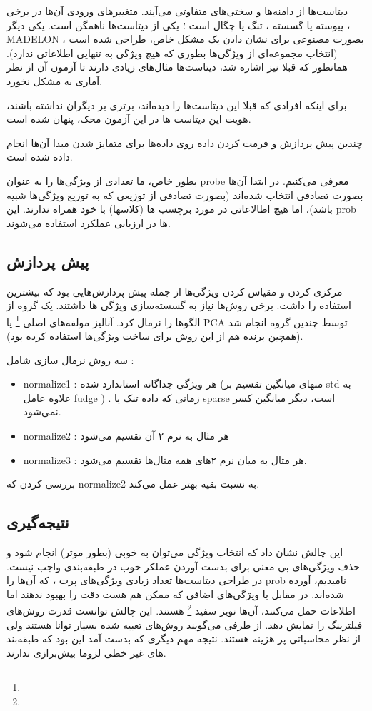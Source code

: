 \documentclass[a4paper, 12pt]{article}
\begin{document}
دیتاست‌ها از دامنه‌ها و سختی‌های متفاوتی  می‌آیند. متغییر‌های ورودی‌ آن‌ها در برخی پیوسته یا گسسته  ، تنگ یا چگال است ؛ یکی از دیتاست‌ها ناهمگن است. یکی دیگر 
،
MADELON
، 
بصورت مصنوعی برای نشان دادن یک مشکل خاص، طراحی شده است (انتخاب مجموعه‌ای از ویژگی‌ها بطوری که هیچ ویژگی به تنهایی اطلاعاتی ندارد). همانطور که قبلا نیز اشاره شد، دیتاست‌ها مثال‌های زیادی دارند تا آزمون آن از نظر آماری به مشکل نخورد. 

برای اینکه افرادی که قبلا این دیتاست‌ها را دیده‌اند، برتری بر دیگران نداشته باشند،  هویت این دیتاست ها در این آزمون محک، پنهان شده است. 

چندین پیش پردازش 
و فرمت کردن داده روی داده‌ها برای متمایز شدن مبدا آن‌ها انجام داده شده است. 


بطور خاص، ما تعدادی از ویژگی‌ها را به عنوان probe معرفی می‌کنیم. در ابتدا آن‌ها بصورت تصادفی انتخاب شده‌اند (بصورت تصادفی از توزیعی که به توزیع ویژگی‌ها شبیه باشد)، اما هیچ اطالاعاتی در مورد برچسب ها (کلاسها) با خود همراه ندارند. این prob ‌ها در ارزیابی عملکرد استفاده می‌شوند.  



\subsection*{پیش پردازش}
مرکزی کردن و مقیاس کردن ویژگی‌ها از جمله پیش پردازش‌هایی بود که بیشترین استفاده را داشت. برخی روش‌ها نیاز به گسسته‌سازی ویژگی ها داشتند. یک گروه از الگوها را نرمال کرد. آنالیز مولفه‌های اصلی 
\footnote{}
یا PCA توسط چندین گروه انجام شد (همچین برنده هم از این روش برای ساخت ویژگی‌ها استفاده کرده بود). 

سه روش نرمال سازی شامل : 
\begin{itemize}
	\item 
	normalize1 :
	هر ویژگی جداگانه استاندارد شده (منهای میانگین تقسیم بر std به علاوه عامل fudge ) . زمانی که داده تنک یا sparse است، دیگر میانگین کسر نمی‌شود.
	\item
	normalize2 :
	 هر مثال به نرم ۲ آن تقسیم می‌شود
	\item
	normalize3 :
	هر مثال  به میان‌ نرم ۲‌های همه مثال‌ها تقسیم می‌شود.
\end{itemize}
بررسی کردن که 
normalize2
به نسبت بقیه بهتر عمل می‌کند.

\subsection*{نتیجه‌گیری}
این چالش نشان داد که انتخاب ویژگی می‌توان به خوبی (بطور موثر) انجام شود و حذف ویژگی‌های بی معنی برای بدست آوردن عملکر خوب در طبقه‌بندی واجب نیست.  در طراحی دیتاست‌ها تعداد زیادی ویژگی‌های پرت ، که آن‌ها را prob نامیدیم، آورده شده‌اند. در مقابل با ویژگی‌های اضافی که ممکن هم هست دقت را بهبود ندهند اما اطلاعات حمل می‌کنند، آن‌ها نویز سفید
\footnote{}
هستند.  این چالش توانست قدرت روش‌های فیلترینگ را نمایش دهد. از طرفی می‌گویند روش‌های تعبیه شده بسیار توانا هستند ولی از نظر محاسباتی پر هزینه هستند. نتیجه مهم دیگری که بدست آمد این بود که طبقه‌بند های غیر خطی لزوما بیش‌برازی ندارند. 
\end{document}

